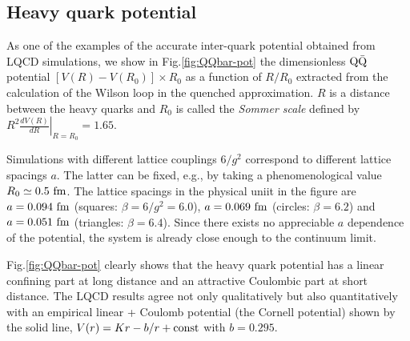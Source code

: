  
 
\subsection{Heavy quark potential}

 As one of the examples of the accurate  inter-quark potential obtained from LQCD simulations,
 we  show in Fig.\ref{fig:QQbar-pot}  the  
 dimensionless ${\rm Q}\bar{\rm Q}$ potential 
$[V(R)-V(R_0)]\times R_0$
 as a function of $R/R_0$ extracted from the calculation of the   
   Wilson loop in the quenched approximation.
 $R$ is a distance between the heavy quarks
  and $R_0$ is called the {\it Sommer scale}   defined by
 $  \left. R^2 \frac{dV(R)}{dR} \right|_{R=R_0}=1.65$.
 
 Simulations with different lattice couplings $6/g^2$
  correspond to different lattice spacings $a$.
 The latter can be fixed, e.g., by   
 taking a phenomenological value
  $R_0\simeq 0.5\ {\rm fm}$. 
    The lattice spacings in the physical uniit in the figure are
   $a=0.094\ {\rm fm}$ (squares: $\beta=6/g^2=6.0$),
    $a= 0.069\ {\rm fm}$ (circles: $\beta=6.2$)
  and  $a=0.051\ {\rm fm}$ (triangles: $\beta=6.4$).
  Since there exists no appreciable $a$ dependence of the potential,
 the system is already close enough to the continuum limit. 
  
 Fig.\ref{fig:QQbar-pot} clearly shows that the 
  heavy quark potential has a linear confining part
   at long distance and an attractive Coulombic part 
    at short distance. The LQCD results agree
     not only qualitatively but also quantitatively  
  with an empirical linear + Coulomb potential
  (the Cornell potential)    shown by the solid line,
   $V(r) = Kr - b/r + {\rm const}$ with $b=0.295$.  
   
